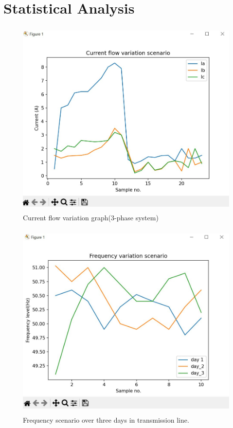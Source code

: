 \documentclass[a4paper,12pt,oneside]{book}
\begin{document}
  \section{Statistical Analysis}
        \begin{figure}[h!]
          \centering
          \includegraphics[height=10cm]{Figures/1.jpg} 
          \caption{Current flow variation graph(3-phase system)}
          \label{fig:current-flow-variation}
        \end{figure}

        \begin{figure}[ht]
          \centering
          \includegraphics[height=10cm]{Figures/2.jpg} 
          \caption{Frequency scenario over three days in transmission line.}
          \label{fig:Frequency-scenario}
        \end{figure}
\end{document}
